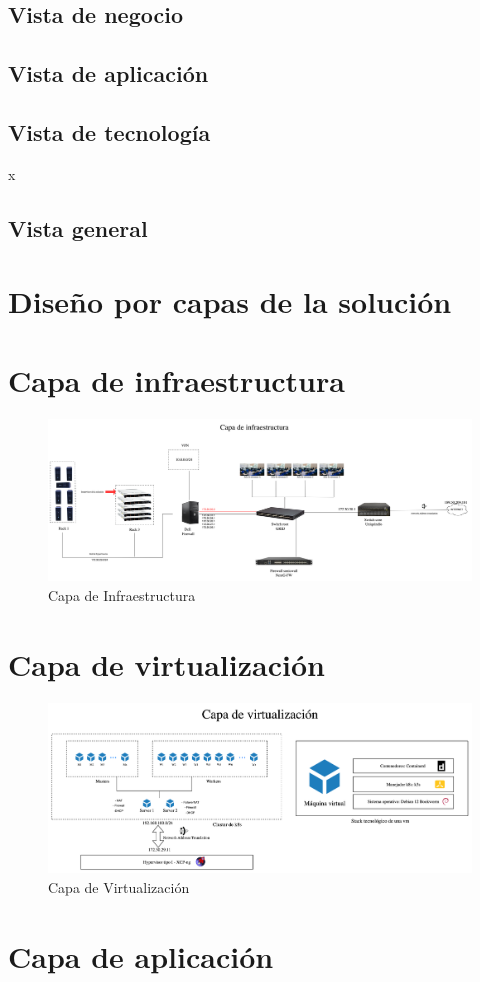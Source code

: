 \subsection{Vista de negocio}


\subsection{Vista de aplicación}


\subsection{Vista de tecnología}
x


\subsection{Vista general}


\section{Diseño por capas de la solución}

\section{Capa de infraestructura}

\begin{figure}[H]
    \centering
    \includegraphics[width=\textwidth]{tablas-images/cp6/disenio-N1.png}
    \caption{Capa de Infraestructura}
\end{figure}

\section{Capa de virtualización}

\begin{figure}[H]
    \centering
    \includegraphics[width=\textwidth]{tablas-images/cp6/disenio-N2.png}
    \caption{Capa de Virtualización}
\end{figure}

\section{Capa de aplicación}
